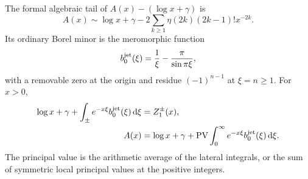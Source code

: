 \begin{theorem}
\label{ojf:thm:borelzero}
The formal algebraic tail of $A(x)-(\log x+\gamma)$ is
\begin{equation}\label{ojf:eq:A-asymptotic}
 A(x)\sim\log x+\gamma-
          2\sum_{k\ge1}\eta(2k)(2k-1)!x^{-2k}.
\end{equation}
Its ordinary Borel minor is the meromorphic function
\begin{equation}\label{ojf:eq:b0}
 b_0^{\rm jet}(\xi)=\frac1\xi-\frac\pi{\sin\pi\xi},
\end{equation}
with a removable zero at the origin and residue $(-1)^{n-1}$ at
$\xi=n\ge1$. For $x>0$,
\begin{align}
 \log x+\gamma+\int_\pm e^{-x\xi}b_0^{\rm jet}(\xi)\,\mathrm d\xi
     &=Z_1^\pm(x),\label{ojf:eq:b0-lateral}\\
 A(x)&=\log x+\gamma+
          \operatorname{PV}\int_0^\infty e^{-x\xi}b_0^{\rm jet}(\xi)\,\mathrm d\xi.
                                                        \label{ojf:eq:b0-PV}
\end{align}
The principal value is the arithmetic average of the lateral integrals,
or the sum of symmetric local principal values at the positive integers.
\end{theorem}

